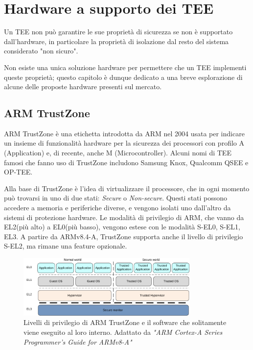 \documentclass[12pt,italian]{report}
\begin{document}
\chapter{Hardware a supporto dei TEE}
\label{chap:hardware-supporto-tee}
Un TEE non può garantire le sue proprietà di sicurezza se non è supportato
dall'hardware, in particolare la proprietà di isolazione dal resto del
sistema considerato "non sicuro".

Non esiste una unica soluzione hardware per permettere che un TEE implementi
queste proprietà; questo capitolo è dunque dedicato a una breve
esplorazione di alcune delle proposte hardware presenti sul mercato.

\section{ARM TrustZone}
\label{sec:arm-trustzone}
ARM TrustZone\cite{trustzone} è una etichetta introdotta da ARM nel 2004
usata per indicare un insieme di funzionalità hardware per la
sicurezza dei processori con profilo A (Application) e, di recente,
anche M (Microcontroller).
Alcuni nomi di TEE famosi che fanno uso di TrustZone includono
Samsung Knox, Qualcomm QSEE e OP-TEE.

Alla base di TrustZone è l'idea di virtualizzare il processore, che in
ogni momento può trovarsi in uno di due stati:
\emph{Secure} o \emph{Non-secure}.
Questi stati possono accedere a memoria e periferiche diverse, e
vengono isolati uno dall'altro da sistemi di protezione hardware.
Le modalità di privilegio di ARM, che vanno da EL2(più alto)
a EL0(più basso), vengono estese con le modalità S-EL0, S-EL1, EL3.
A partire da ARMv8.4-A, TrustZone supporta anche il livello
di privilegio S-EL2, ma rimane una feature opzionale.

\begin{figure}[h]
    \centering
    \includegraphics[width=0.8\textwidth]{immagini/aarch64-exception-levels}
    \caption{
        Livelli di privilegio di ARM TrustZone e il software
        che solitamente viene eseguito al loro interno.
        Adattato da
        \textit{"ARM Cortex-A Series Programmer's Guide for ARMv8-A"}
        \cite{arm_programmers_manual}
    }
    \label{fig:arm-exception-levels}
\end{figure}
\end{document}
